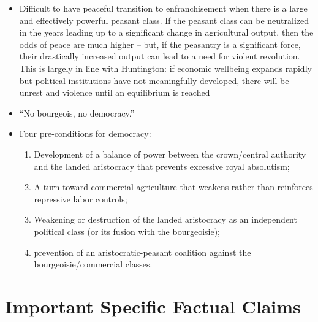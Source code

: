 \documentclass[12pt]{article}
\begin{document}
\begin{itemize}[leftmargin=*, itemsep=4pt]
    \item Difficult to have peaceful transition to enfranchisement when there is a large and effectively powerful peasant class. If the peasant class can be neutralized in the years leading up to a significant change in agricultural output, then the odds of peace are much higher -- but, if the peasantry is a significant force, their drastically increased output can lead to a need for violent revolution. This is largely in line with Huntington: if economic wellbeing expands rapidly but political institutions have not meaningfully developed, there will be unrest and violence until an equilibrium is reached
    \item ``No bourgeois, no democracy.''
    \item Four pre-conditions for democracy:
    \begin{enumerate}
        \item Development of a balance of power between the crown/central authority and the landed aristocracy that prevents excessive royal absolutism;
        \item A turn toward commercial agriculture that weakens rather than reinforces repressive labor controls;
        \item Weakening or destruction of the landed aristocracy as an independent political class (or its fusion with the bourgeoisie);
        \item prevention of an aristocratic-peasant coalition against the bourgeoisie/commercial classes.
    \end{enumerate}
\end{itemize}


\section{Important Specific Factual Claims}
\end{document}
